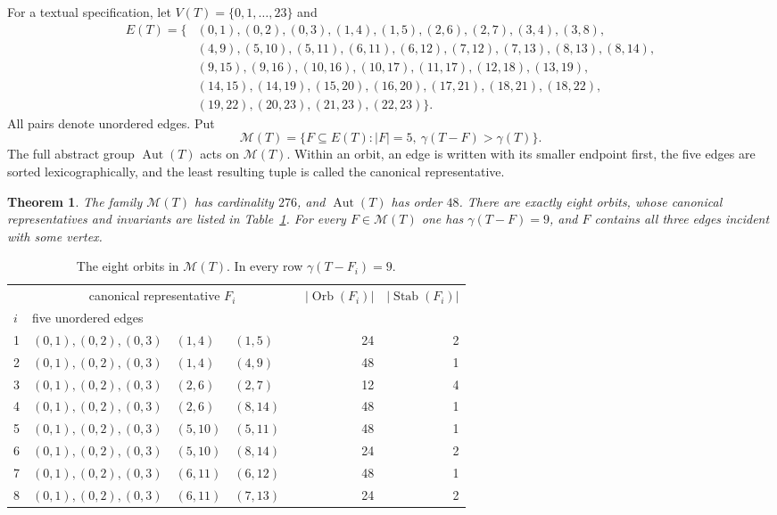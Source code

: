 \documentclass[11pt]{article}
\newtheorem{theorem}{Theorem}
\newcommand{\Aut}{\operatorname{Aut}}
\newcommand{\Orb}{\operatorname{Orb}}
\newcommand{\Stab}{\operatorname{Stab}}
\begin{document}
For a textual specification, let $V(T)=\{0,1,\ldots,23\}$ and
\begin{align*}
E(T)=\{& (0,1),(0,2),(0,3),(1,4),(1,5),(2,6),(2,7),(3,4),(3,8),\\
       &(4,9),(5,10),(5,11),(6,11),(6,12),(7,12),(7,13),(8,13),(8,14),\\
       &(9,15),(9,16),(10,16),(10,17),(11,17),(12,18),(13,19),\\
       &(14,15),(14,19),(15,20),(16,20),(17,21),(18,21),(18,22),\\
       &(19,22),(20,23),(21,23),(22,23)\}.
\end{align*}
All pairs denote unordered edges.  Put
\[
 \mathcal M(T)=\{F\subseteq E(T): |F|=5,
              \ \gamma(T-F)>\gamma(T)\}.
\]
The full abstract group $\Aut(T)$ acts on $\mathcal M(T)$.  Within an
orbit, an edge is written with its smaller endpoint first, the five
edges are sorted lexicographically, and the least resulting tuple is
called the canonical representative.

\begin{theorem}\label{thm:classification}
The family $\mathcal M(T)$ has cardinality $276$, and $\Aut(T)$ has
order $48$.  There are exactly eight orbits, whose canonical
representatives and invariants are listed in Table~\ref{tab:orbits}.
For every $F\in\mathcal M(T)$ one has $\gamma(T-F)=9$, and $F$ contains
all three edges incident with some vertex.
\end{theorem}

\begin{table}[ht]
\centering
\small
\begin{tabular}{@{}llllr r r@{}}
\toprule
&\multicolumn{4}{c}{canonical representative $F_i$}
&$|\Orb(F_i)|$&$|\Stab(F_i)|$\\
\cmidrule(lr){2-5}
$i$&\multicolumn{4}{l}{five unordered edges}& &\\
\midrule
1&$(0,1),(0,2),(0,3)$&$(1,4)$&$(1,5)$&&24&2\\
2&$(0,1),(0,2),(0,3)$&$(1,4)$&$(4,9)$&&48&1\\
3&$(0,1),(0,2),(0,3)$&$(2,6)$&$(2,7)$&&12&4\\
4&$(0,1),(0,2),(0,3)$&$(2,6)$&$(8,14)$&&48&1\\
5&$(0,1),(0,2),(0,3)$&$(5,10)$&$(5,11)$&&48&1\\
6&$(0,1),(0,2),(0,3)$&$(5,10)$&$(8,14)$&&24&2\\
7&$(0,1),(0,2),(0,3)$&$(6,11)$&$(6,12)$&&48&1\\
8&$(0,1),(0,2),(0,3)$&$(6,11)$&$(7,13)$&&24&2\\
\bottomrule
\end{tabular}
\caption{The eight orbits in $\mathcal M(T)$.  In every row
$\gamma(T-F_i)=9$.}
\label{tab:orbits}
\end{table}
\end{document}

